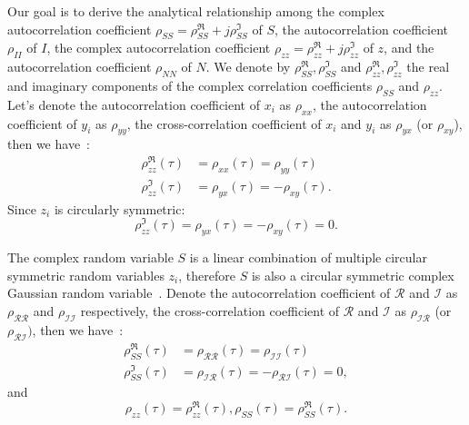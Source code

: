 \documentclass[journal]{IEEEtran}
\begin{document}
Our goal is to derive the analytical relationship among the complex autocorrelation coefficient $\rho_{S S}=\rho_{S S}^{\Re}+j \rho_{S S}^{\Im}$ of $S$,
the autocorrelation coefficient $\rho_{I I}$ of $I$,
the complex autocorrelation coefficient $\rho_{z z}=\rho_{z z}^{\Re}+j \rho_{z z}^{\Im}$ of $z$, and
the autocorrelation coefficient $\rho_{N N}$ of $N$.
We denote by
$\rho_{S S}^{\Re}, \rho_{S S}^{\Im}$ and $\rho_{z z}^{\Re}, \rho_{z z}^{\Im}$ the real and imaginary components of the complex correlation coefficients $\rho_{S S}$ and $\rho_{z z}$.
Let's denote the autocorrelation coefficient of $x_i$ as $\rho_{x x}$,
the autocorrelation coefficient of $y_i$ as $\rho_{y y}$,
the cross-correlation coefficient of $x_i$ and $y_i$ as $\rho_{y x}$ (or $\rho_{x y}$), then we have~\cite{Jacovitti:1992,Jacovitti:1994,Miller:1974}:
\begin{equation}
\begin{split}
\rho_{z z}^{\Re}(\tau) & = \rho_{x x}(\tau)=\rho_{y y}(\tau)  \\
\rho_{z z}^{\Im}(\tau) & = \rho_{y x}(\tau)=-\rho_{x y}(\tau).
\label{eq16}
\end{split}
\end{equation}
Since $z_i$ is circularly symmetric:
\begin{equation}
\rho_{z z}^{\Im}(\tau) = \rho_{y x}(\tau)=-\rho_{x y}(\tau)=0.
\label{eq17}
\end{equation}

The complex random variable $S$ is a linear combination of multiple circular symmetric random variables $z_i$, therefore $S$ is also a circular symmetric complex Gaussian random variable~\cite{Goodman:2007}. Denote the autocorrelation
coefficient of $\mathcal{R}$ and $\mathcal{I}$ as $\rho_{\mathcal{R} \mathcal{R}}$ and $\rho_{\mathcal{I} \mathcal{I}}$ respectively, the cross-correlation coefficient of $\mathcal{R}$ and $\mathcal{I}$ as $\rho_{\mathcal{I} \mathcal{R}}$ (or $\rho_{\mathcal{R} \mathcal{I}})$, then we have~\cite{Jacovitti:1992,Jacovitti:1994,Miller:1974}:
\begin{equation}
\begin{split}
\rho_{S S}^{\Re}(\tau) & = \rho_{\mathcal{R} \mathcal{R}}(\tau)=\rho_{\mathcal{I} \mathcal{I}}(\tau)  \\
\rho_{S S}^{\Im}(\tau) & = \rho_{\mathcal{I} \mathcal{R}}(\tau)=-\rho_{\mathcal{R} \mathcal{I}}(\tau)= 0,
\label{eq18}
\end{split}
\end{equation}
and
\begin{equation}
\rho_{z z}(\tau) = \rho_{z z}^{\Re}(\tau) , \rho_{S S}(\tau) = \rho_{S S}^{\Re}(\tau).
\label{eq19}
\end{equation}
\end{document}
